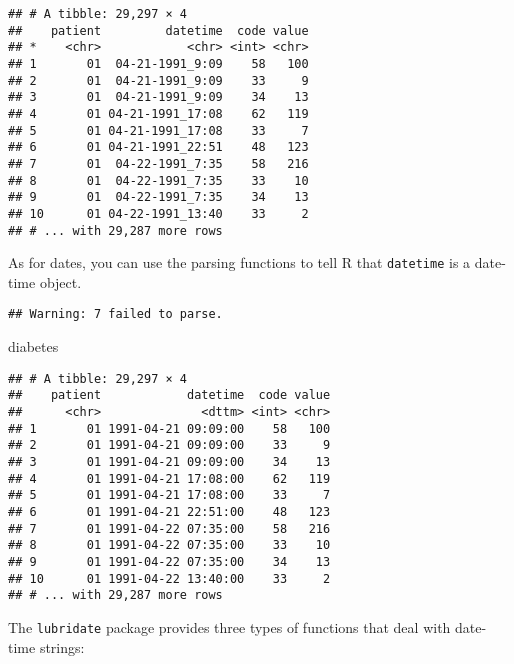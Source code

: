 \documentclass[]{book}
\newenvironment{Shaded}{\begin{snugshade}}{\end{snugshade}}
\newcommand{\KeywordTok}[1]{\textcolor[rgb]{0.13,0.29,0.53}{\textbf{{#1}}}}
\newcommand{\DataTypeTok}[1]{\textcolor[rgb]{0.13,0.29,0.53}{{#1}}}
\newcommand{\StringTok}[1]{\textcolor[rgb]{0.31,0.60,0.02}{{#1}}}
\newcommand{\NormalTok}[1]{{#1}}
\begin{document}
\begin{verbatim}
## # A tibble: 29,297 × 4
##    patient         datetime  code value
## *    <chr>            <chr> <int> <chr>
## 1       01  04-21-1991_9:09    58   100
## 2       01  04-21-1991_9:09    33     9
## 3       01  04-21-1991_9:09    34    13
## 4       01 04-21-1991_17:08    62   119
## 5       01 04-21-1991_17:08    33     7
## 6       01 04-21-1991_22:51    48   123
## 7       01  04-22-1991_7:35    58   216
## 8       01  04-22-1991_7:35    33    10
## 9       01  04-22-1991_7:35    34    13
## 10      01 04-22-1991_13:40    33     2
## # ... with 29,287 more rows
\end{verbatim}

As for dates, you can use the parsing functions to tell R that
\texttt{datetime} is a date-time object.

\begin{Shaded}
\end{Shaded}

\begin{verbatim}
## Warning: 7 failed to parse.
\end{verbatim}

\begin{Shaded}
\begin{Highlighting}[]
\NormalTok{diabetes}
\end{Highlighting}
\end{Shaded}

\begin{verbatim}
## # A tibble: 29,297 × 4
##    patient            datetime  code value
##      <chr>              <dttm> <int> <chr>
## 1       01 1991-04-21 09:09:00    58   100
## 2       01 1991-04-21 09:09:00    33     9
## 3       01 1991-04-21 09:09:00    34    13
## 4       01 1991-04-21 17:08:00    62   119
## 5       01 1991-04-21 17:08:00    33     7
## 6       01 1991-04-21 22:51:00    48   123
## 7       01 1991-04-22 07:35:00    58   216
## 8       01 1991-04-22 07:35:00    33    10
## 9       01 1991-04-22 07:35:00    34    13
## 10      01 1991-04-22 13:40:00    33     2
## # ... with 29,287 more rows
\end{verbatim}

The \texttt{lubridate} package provides three types of functions that
deal with date-time strings:
\end{document}
